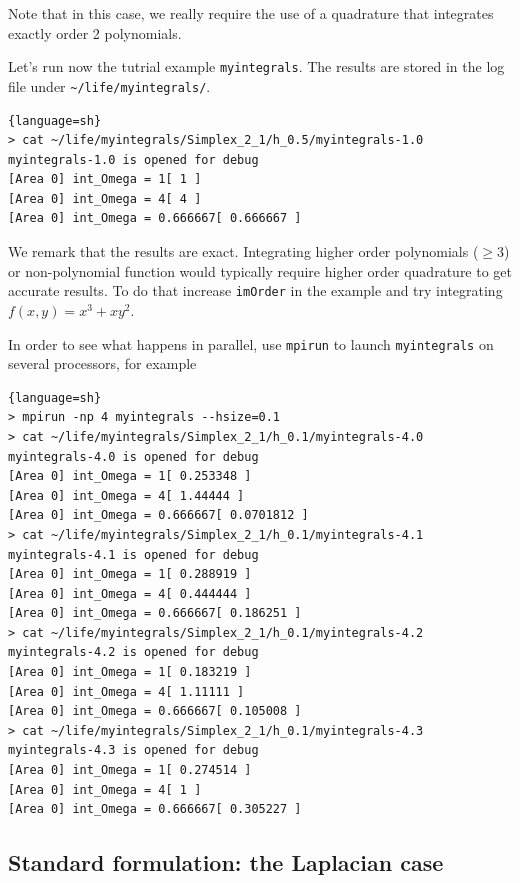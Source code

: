 \documentclass[a4paper]{book}
\begin{document}


Note that in this case, we really require the use of a quadrature that
integrates exactly order 2 polynomials.

Let's run now the tutrial example \lstinline!myintegrals!. The results are stored
in the log file under \lstinline!~/life/myintegrals/!.

\begin{lstlisting}{language=sh}
> cat ~/life/myintegrals/Simplex_2_1/h_0.5/myintegrals-1.0
myintegrals-1.0 is opened for debug
[Area 0] int_Omega = 1[ 1 ]
[Area 0] int_Omega = 4[ 4 ]
[Area 0] int_Omega = 0.666667[ 0.666667 ]
\end{lstlisting}

We remark that the results are exact. Integrating higher order
polynomials ($\geq 3$) or non-polynomial function would typically
require higher order quadrature to get accurate results. To do that
increase \lstinline!imOrder! in the example and try integrating
$f(x,y)=x^3 + x y^2$.


In order to see what happens in parallel, use \lstinline!mpirun! to
launch \lstinline!myintegrals! on several processors, for example

\begin{lstlisting}{language=sh}
> mpirun -np 4 myintegrals --hsize=0.1
> cat ~/life/myintegrals/Simplex_2_1/h_0.1/myintegrals-4.0
myintegrals-4.0 is opened for debug
[Area 0] int_Omega = 1[ 0.253348 ]
[Area 0] int_Omega = 4[ 1.44444 ]
[Area 0] int_Omega = 0.666667[ 0.0701812 ]
> cat ~/life/myintegrals/Simplex_2_1/h_0.1/myintegrals-4.1
myintegrals-4.1 is opened for debug
[Area 0] int_Omega = 1[ 0.288919 ]
[Area 0] int_Omega = 4[ 0.444444 ]
[Area 0] int_Omega = 0.666667[ 0.186251 ]
> cat ~/life/myintegrals/Simplex_2_1/h_0.1/myintegrals-4.2
myintegrals-4.2 is opened for debug
[Area 0] int_Omega = 1[ 0.183219 ]
[Area 0] int_Omega = 4[ 1.11111 ]
[Area 0] int_Omega = 0.666667[ 0.105008 ]
> cat ~/life/myintegrals/Simplex_2_1/h_0.1/myintegrals-4.3
myintegrals-4.3 is opened for debug
[Area 0] int_Omega = 1[ 0.274514 ]
[Area 0] int_Omega = 4[ 1 ]
[Area 0] int_Omega = 0.666667[ 0.305227 ]
\end{lstlisting}

\subsection{Standard formulation: the Laplacian case}
\label{sec:defin-bilin-forms}
\end{document}
